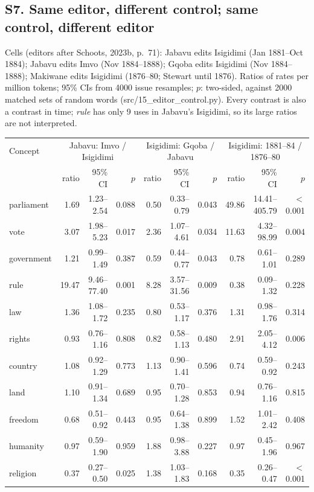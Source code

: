 \subsection*{S7. Same editor, different control; same control, different editor}
Cells (editors after Schoots, 2023b, p.~71): Jabavu edits Isigidimi (Jan 1881--Oct 1884); Jabavu edits Imvo (Nov 1884--1888); Gqoba edits Isigidimi (Nov 1884--1888); Makiwane edits Isigidimi (1876--80; Stewart until 1876). Ratios of rates per million tokens; 95\% CIs from 4000 issue resamples; $p$: two-sided, against 2000 matched sets of random words (src/15\_editor\_control.py). Every contrast is also a contrast in time; \emph{rule} has only 9 uses in Jabavu's Isigidimi, so its large ratios are not interpreted.\\[2pt]
\begin{tabular}{@{}lrrrrrrrrr@{}}
\toprule
Concept & \multicolumn{3}{c}{Jabavu: Imvo / Isigidimi} & \multicolumn{3}{c}{Isigidimi: Gqoba / Jabavu} & \multicolumn{3}{c}{Isigidimi: 1881--84 / 1876--80} \\
 & ratio & 95\% CI & $p$ & ratio & 95\% CI & $p$ & ratio & 95\% CI & $p$ \\ \midrule
parliament & 1.69 & 1.23--2.54 & 0.088 & 0.50 & 0.33--0.79 & 0.043 & 49.86 & 14.41--405.79 & $<$0.001 \\
vote & 3.07 & 1.98--5.23 & 0.017 & 2.36 & 1.07--4.61 & 0.034 & 11.63 & 4.32--98.99 & 0.004 \\
government & 1.21 & 0.99--1.49 & 0.387 & 0.59 & 0.44--0.77 & 0.043 & 0.78 & 0.61--1.01 & 0.289 \\
rule & 19.47 & 9.46--77.40 & 0.001 & 8.28 & 3.57--31.56 & 0.009 & 0.38 & 0.09--1.32 & 0.228 \\
law & 1.36 & 1.08--1.72 & 0.235 & 0.80 & 0.53--1.17 & 0.376 & 1.31 & 0.98--1.76 & 0.314 \\
rights & 0.93 & 0.76--1.16 & 0.808 & 0.82 & 0.58--1.13 & 0.480 & 2.91 & 2.05--4.12 & 0.006 \\
country & 1.08 & 0.92--1.29 & 0.773 & 1.13 & 0.90--1.41 & 0.596 & 0.74 & 0.59--0.92 & 0.243 \\
land & 1.10 & 0.91--1.34 & 0.689 & 0.95 & 0.70--1.28 & 0.853 & 0.94 & 0.76--1.16 & 0.815 \\
freedom & 0.68 & 0.51--0.92 & 0.443 & 0.95 & 0.64--1.38 & 0.899 & 1.52 & 1.01--2.42 & 0.408 \\
humanity & 0.97 & 0.59--1.90 & 0.959 & 1.88 & 0.98--3.88 & 0.227 & 0.97 & 0.45--1.96 & 0.967 \\
religion & 0.37 & 0.27--0.50 & 0.025 & 1.38 & 1.03--1.83 & 0.168 & 0.35 & 0.26--0.47 & $<$0.001 \\
\bottomrule
\end{tabular}

